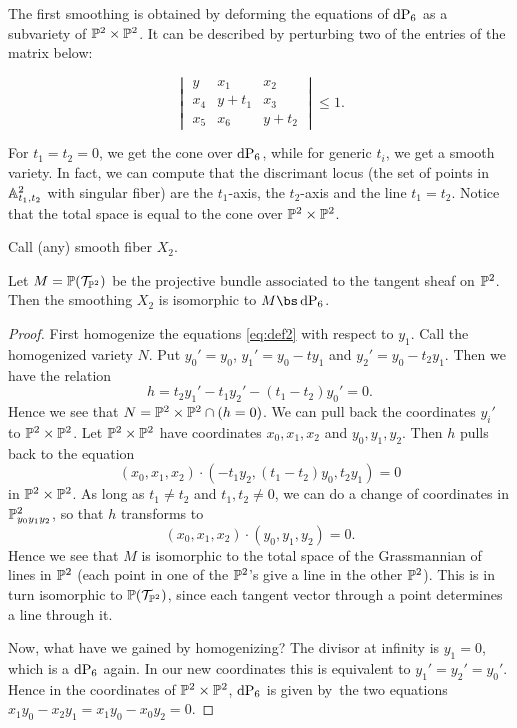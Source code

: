 The first smoothing is obtained by deforming the equations of $\dP6$ as a subvariety of $\P^2 \times \P^2$.  It can be described by perturbing two of the entries of the matrix below:

\begin{equation}
\label{eq:def2}
\begin{vmatrix}
y & x_1 & x_2 \\
x_4 & y+t_1 & x_3 \\
x_5 & x_6 & y+t_2
\end{vmatrix} \leq 1.
\end{equation}


For $t_1=t_2=0$, we get the cone over $\dP6$, while for generic $t_i$, we get a smooth variety. In fact, we can compute that the discrimant locus (the set of points in $\A^2_{t_1,t_2}$ with singular fiber) are the $t_1$-axis, the $t_2$-axis and the line $t_1=t_2$. Notice that the total space is equal to the cone over $\P^2 \times \P^2$.

Call (any) smooth fiber $X_2$. 

\begin{lemma}
Let $M=\P(\mathcal T_ {\P^2})$ be the projective bundle associated to the tangent sheaf on $\P^2$. Then the smoothing $X_2$ is isomorphic to $M \bs \dP6$. 
\end{lemma}
\begin{proof}
First homogenize the equations \eqref{eq:def2} with respect to $y_1$. Call the homogenized variety $N$. Put $y_0'=y_0$, $y_1' = y_0-ty_1$ and $y_2'=y_0-t_2y_1$. Then we have the relation
\[
h = t_2y_1'-t_1y_2' - (t_1-t_2)y_0' = 0.
\]
Hence we see that $N=\P^2 \times \P^2 \cap (h = 0)$. We can pull back the coordinates $y_i'$ to $\P^2 \times \P^2$. Let $\P^2 \times \P^2$ have coordinates $x_0,x_1,x_2$ and $y_0,y_1,y_2$. Then $h$ pulls back to the equation
\[
(x_0,x_1,x_2) \cdot (-t_1y_2, (t_1-t_2)y_0,t_2y_1) = 0
\]
in $\P^2 \times \P^2$. As long as $t_1 \neq t_2$ and $t_1,t_2 \neq 0$, we can do a change of coordinates in $\P^2_{y_0y_1y_2}$, so that $h$ transforms to
\[
(x_0,x_1,x_2) \cdot(y_0,y_1,y_2) = 0.
\]
Hence we see that $M$ is isomorphic to the total space of the Grassmannian of lines in $\P^2$ (each point in one of the $\P^2$'s give a line in the other $\P^2$). This is in turn isomorphic to $\P(\mathcal T_{\P^2})$, since each tangent vector through a point determines a line through it.

Now, what have we gained by homogenizing? The divisor at infinity is $y_1=0$, which is a $\dP6$ again. In our new coordinates this is equivalent to $y_1'=y_2'=y_0'$. Hence in the coordinates of $\P^2 \times \P^2$, $\dP6$ is given by the two equations $x_1y_0-x_2y_1=x_1y_0-x_0y_2=0$. 
\end{proof}


